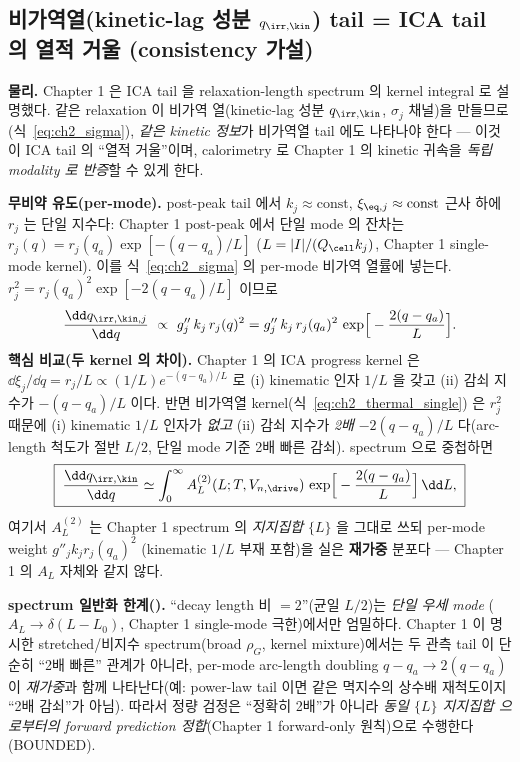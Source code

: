 \subsection{비가역열(kinetic-lag 성분 $q_{\irr,\kin}$) tail = ICA tail 의 열적 거울 (consistency 가설)}\label{sec:ch2_thermal_tail}
\textbf{물리.} Chapter 1 은 ICA tail 을 relaxation-length spectrum 의 kernel integral 로 설명했다. 같은
relaxation 이 비가역 열(kinetic-lag 성분 $q_{\irr,\kin}$, $\sigma_j$ 채널)을 만들므로(식~\eqref{eq:ch2_sigma}), \emph{같은 kinetic 정보}가 비가역열 tail 에도
나타나야 한다 — 이것이 ICA tail 의 ``열적 거울''이며, calorimetry 로 Chapter 1 의 kinetic 귀속을 \emph{독립
modality 로 반증}할 수 있게 한다.

\textbf{무비약 유도(per-mode).} post-peak tail 에서 $k_j\approx\mathrm{const}$, $\xi_{\eq,j}\approx\mathrm{const}$
근사 하에 $r_j$ 는 단일 지수다: Chapter 1 post-peak 에서 단일 mode 의 잔차는 $r_j(q)=r_j(q_a)\exp[-(q-q_a)/L]$
($L=|I|/(Q_\cell k_j)$, Chapter 1 single-mode kernel). 이를 식~\eqref{eq:ch2_sigma} 의 per-mode 비가역
열률에 넣는다. $r_j^2=r_j(q_a)^2\exp[-2(q-q_a)/L]$ 이므로
\begin{equation}
\frac{\dd q_{\irr,\kin,j}}{\dd q}\ \propto\ g''_j\,k_j\,r_j(q)^2
= g''_j\,k_j\,r_j(q_a)^2\,\exp\!\Big[-\frac{2(q-q_a)}{L}\Big].
\label{eq:ch2_thermal_single}
\end{equation}
\textbf{핵심 비교(두 kernel 의 차이).} Chapter 1 의 ICA progress kernel 은 $\dd\xi_j/\dd q=r_j/L\propto(1/L)e^{-(q-q_a)/L}$
로 (i) kinematic 인자 $1/L$ 을 갖고 (ii) 감쇠 지수가 $-(q-q_a)/L$ 이다. 반면 비가역열 kernel(식~\eqref{eq:ch2_thermal_single})
은 $r_j^2$ 때문에 (i) kinematic $1/L$ 인자가 \emph{없고} (ii) 감쇠 지수가 \emph{2배} $-2(q-q_a)/L$ 다(arc-length
척도가 절반 $L/2$, 단일 mode 기준 2배 빠른 감쇠). spectrum 으로 중첩하면
\begin{equation}
\boxed{\;\frac{\dd q_{\irr,\kin}}{\dd q}\simeq\int_0^\infty A_L^{(2)}(L;T,V_{n,\drive})\,
\exp\!\Big[-\frac{2(q-q_a)}{L}\Big]\,\dd L,\;}
\label{eq:ch2_thermal_kernel}
\end{equation}
여기서 $A_L^{(2)}$ 는 Chapter 1 spectrum 의 \emph{지지집합} $\{L\}$ 을 그대로 쓰되 per-mode weight $g''_j k_j r_j(q_a)^2$
(kinematic $1/L$ 부재 포함)을 실은 \textbf{재가중} 분포다 — Chapter 1 의 $A_L$ 자체와 같지 않다.
\begin{boundbox}
\textbf{spectrum 일반화 한계().} ``decay length 비 $=2$''(균일 $L/2$)는 \emph{단일 우세 mode}
($A_L\to\delta(L-L_0)$, Chapter 1 single-mode 극한)에서만 엄밀하다. Chapter 1 이 명시한 stretched/비지수
spectrum(broad $\rho_G$, kernel mixture)에서는 두 관측 tail 이 단순히 ``2배 빠른'' 관계가 아니라, per-mode
arc-length doubling $q-q_a\to2(q-q_a)$ 이 \emph{재가중}과 함께 나타난다(예: power-law tail 이면 같은 멱지수의
상수배 재척도이지 ``2배 감쇠''가 아님). 따라서 정량 검정은 ``정확히 2배''가 아니라 \emph{동일 $\{L\}$ 지지집합
으로부터의 forward prediction 정합}(Chapter 1 forward-only 원칙)으로 수행한다(BOUNDED).
\end{boundbox}

